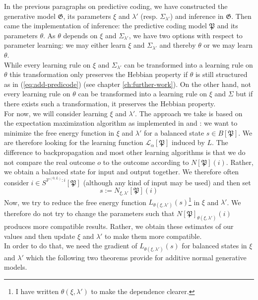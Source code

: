 \documentclass[a4paper,11pt]{report}
\begin{document}
\begin{Par}
In the previous paragraphs on predictive coding, we have constructed the generative model $\mathfrak{G}$, its parameters $\xi$ and $\lambda'$ (resp. $\Sigma_{\lambda'}$) and inference in $\mathfrak{G}$. Then came the implementation of inference: the predictive coding model $\mathfrak{P}$ and its parameters $\theta$. As $\theta$ depends on $\xi$ and $\Sigma_{\lambda'}$, we have two options with respect to parameter learning: we may either learn $\xi$ and $\Sigma_{\lambda'}$ and thereby $\theta$ or we may learn $\theta$.\\
While every learning rule on $\xi$ and $\Sigma_{\lambda'}$ can be transformed into a learning rule on $\theta$ this transformation only preserves the Hebbian property if $\theta$ is still structured as in (\ref{eq:add-predicode}) (see chapter \ref{ch:further-work}). On the other hand, not every learning rule on $\theta$ can be transformed into a learning rule on $\xi$ and $\Sigma$ but if there exists such a transformation, it preserves the Hebbian property.\\
For now, we will consider learning $\xi$ and $\lambda'$. The approach we take is based on the expectation maximization algorithm \cite{Dempster1977} as implemented in \cite{Friston2005} and \cite{Whittington2017}: we want to minimize the free energy function in $\xi$ and $\lambda'$ for a balanced state $s\in B[\mathfrak{P}]$. We are therefore looking for the learning function $\mathcal{L}_{\alpha}[\mathfrak{P}]$ induced by $L$. The difference to backpropagation and most other learning algorithms is that we do not compare the real outcome $o$ to the outcome according to $N[\mathfrak{P}](i)$. Rather, we obtain a balanced state for input and output together. We therefore often consider $i\in S^{\mathcal{V}^{(0,L)}:i}[\mathfrak{P}]$ (although any kind of input may be used) and then set
\[
s:=N_{\xi,\lambda'}[\mathfrak{P}](i)
\]
Now, we try to reduce the free energy function $L_{\theta(\xi,\lambda')}(s)$\footnote{
I have written $\theta(\xi,\lambda')$ to make the dependence clearer.} in $\xi$ and $\lambda'$. We therefore do not try to change the parameters such that $N[\mathfrak{P}]_{\theta(\xi,\lambda')}(i)$ produces more compatible results. Rather, we obtain these estimates of our values and then update $\xi$ and $\lambda'$ to make them more compatible.\\
In order to do that, we need the gradient of $L_{\theta(\xi,\lambda')}(s)$ for balanced states in $\xi$ and $\lambda'$ which the following two theorems provide for additive normal generative models.
\end{Par}
\end{document}
